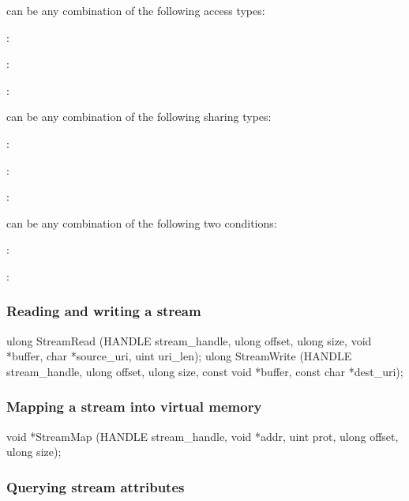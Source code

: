  can be any combination of the following access types:
\begin{compactitem}
\item {}:
\item {}:
\item {}:
\end{compactitem}


 can be any combination of the following sharing types:
\begin{compactitem}
\item {}:
\item {}:
\item {}:
\end{compactitem}


 can be any combination of the following two conditions:
\begin{compactitem}
\item {}:
\item {}:
\end{compactitem}



\subsubsection*{Reading and writing a stream}

\begin{paldef}
ulong StreamRead (HANDLE stream_handle,
                  ulong offset, ulong size, void *buffer,
                  char *source_uri, uint uri_len);
ulong StreamWrite (HANDLE stream_handle,
                   ulong offset, ulong size,
                   const void *buffer,
                   const char *dest_uri);
\end{paldef}


\subsubsection*{Mapping a stream into virtual memory}

\begin{paldef}
void *StreamMap (HANDLE stream_handle, void *addr,
                 uint prot, ulong offset, ulong size);
\end{paldef}



\subsubsection*{Querying stream attributes}

